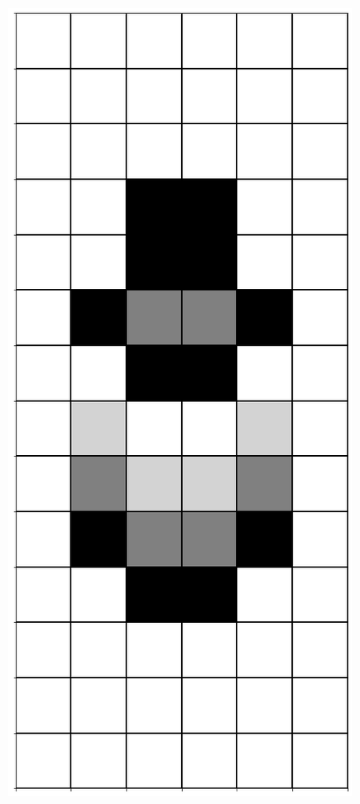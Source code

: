\documentclass[12pt]{article}
\numberwithin{figure}{section} %
\begin{document}
\begin{figure}[H]
\begin{subfigure}{0.18\textwidth}
     	\subcaption{}
   	\end{subfigure}
     	\begin{subfigure}{0.18\textwidth}
     	\centering
     	\includegraphics[width=\linewidth]{Section4/34.2}

\end{subfigure}
\end{figure}
\end{document}
